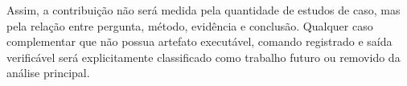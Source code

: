 Assim, a contribuição não será medida pela quantidade de estudos de caso, mas pela relação entre pergunta, método, evidência e conclusão. Qualquer caso complementar que não possua artefato executável, comando registrado e saída verificável será explicitamente classificado como trabalho futuro ou removido da análise principal.
